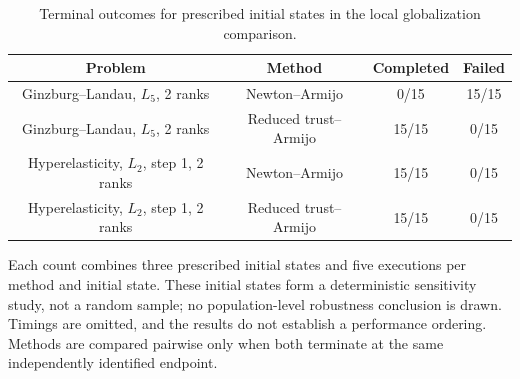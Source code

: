 \begin{table}[t]
  \caption{Terminal outcomes for prescribed initial states in the local globalization comparison.}
  \label{tab:globalization-local-status}
  \centering
  \begin{tabularx}{\linewidth}{C{1.55}C{1.15}C{0.65}C{0.65}}
    \toprule
    Problem & Method & Completed & Failed \\
    \midrule
    Ginzburg--Landau, $L_5$, 2 ranks & Newton--Armijo & 0/15 & 15/15 \\
    Ginzburg--Landau, $L_5$, 2 ranks & Reduced trust--Armijo & 15/15 & 0/15 \\
    Hyperelasticity, $L_2$, step 1, 2 ranks & Newton--Armijo & 15/15 & 0/15 \\
    Hyperelasticity, $L_2$, step 1, 2 ranks & Reduced trust--Armijo & 15/15 & 0/15 \\
    \bottomrule
  \end{tabularx}
  \begin{minipage}{0.96\linewidth}\small
    Each count combines three prescribed initial states and five executions per method and initial state. These initial states form a deterministic sensitivity study, not a random sample; no population-level robustness conclusion is drawn. Timings are omitted, and the results do not establish a performance ordering. Methods are compared pairwise only when both terminate at the same independently identified endpoint.
  \end{minipage}
\end{table}
